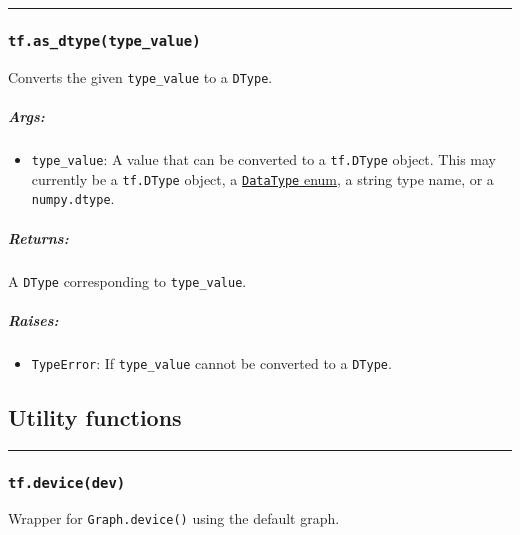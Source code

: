 \begin{center}\rule{0.5\linewidth}{\linethickness}\end{center}

\subsubsection{\texorpdfstring{\lstinline{tf.as_dtype(type_value)}
}{tf.as_dtype(type_value) }}\label{tf.asux5fdtypetypeux5fvalue}

Converts the given \lstinline{type_value} to a \lstinline{DType}.

\subparagraph{Args: }\label{args-20}

\begin{itemize}
\tightlist
\item
  \lstinline{type_value}: A value that can be converted to a
  \lstinline{tf.DType} object. This may currently be a \lstinline{tf.DType}
  object, a
  \href{https://tensorflow.googlesource.com/tensorflow/+/master/tensorflow/core/framework/types.proto}{\lstinline{DataType}
  enum}, a string type name, or a \lstinline{numpy.dtype}.
\end{itemize}

\subparagraph{Returns: }\label{returns-23}

A \lstinline{DType} corresponding to \lstinline{type_value}.

\subparagraph{Raises: }\label{raises-13}

\begin{itemize}
\tightlist
\item
  \lstinline{TypeError}: If \lstinline{type_value} cannot be converted to a
  \lstinline{DType}.
\end{itemize}

\subsection{Utility functions }\label{utility-functions}

\begin{center}\rule{0.5\linewidth}{\linethickness}\end{center}

\subsubsection{\texorpdfstring{\lstinline{tf.device(dev)}
}{tf.device(dev) }}\label{tf.devicedev}

Wrapper for \lstinline{Graph.device()} using the default graph.

